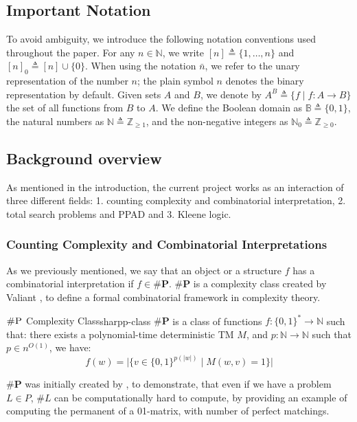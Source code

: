 
\subsection{Important Notation}

To avoid ambiguity, we introduce the following notation conventions used throughout the paper.
For any $n \in \mathbb{N}$, we write $[n] \triangleq \{1, \ldots, n\}$  and $[n]_0 \triangleq [n] \cup \{0\}$. 
When using the notation $\bar{n}$, we refer to the unary representation of the number $n$; the plain symbol $n$
denotes the binary representation by default.
Given sets $A$ and $B$, we denote by $A^B \triangleq \{ f \mid f : A \to B \}$
the set of all functions from $B$ to $A$.
We define the Boolean domain as $\mathbb{B} \triangleq \{0, 1\}$,
the natural numbers as $\mathbb{N} \triangleq \mathbb{Z}_{\geq 1}$,
and the non-negative integers as $\mathbb{N}_0 \triangleq \mathbb{Z}_{\geq 0}$.


\subsection{Background overview}
As mentioned in the introduction, the current project works as an interaction
of three different fields: 1. counting complexity and combinatorial interpretation, 
2. total search problems and PPAD and 3. Kleene logic.


\subsubsection{Counting Complexity and Combinatorial Interpretations}
As we previously mentioned, we say that an object or a structure $f$
has a combinatorial interpretation if $f \in \textbf{\#P}$. $\textbf{\#P}$
is a complexity class created by Valiant \cite{valiant_ComplexityComputingPermanent_1979},
to define a formal combinatorial framework in complexity theory.


\begin{definitionbox}{$\textsc{\#P}$ Complexity Class}{sharpp-class}
    $\textbf{\#P}$ is a class of functions $f: \{0,1\}^* \to \mathbb{N}$
    such that: there
    exists a polynomial-time deterministic TM $M$, and
    $p : \mathbb{N} \to \mathbb{N}$ such that $p \in n^{O(1)}$, we have:
    $$
    f(w) = \Big|\Big\{v \in \{0,1\}^{p(|w|)} \mid M(w, v) =1 \Big\}\Big|
    $$
\end{definitionbox}

$\textbf{\#P}$ was initially created by \cite{valiant_ComplexityComputingPermanent_1979},
to demonstrate, that even if we have a problem $L \in P$, $\#L$ can be computationally
hard to compute, by providing an example of computing the permanent of
a 01-matrix, with number of perfect matchings. 

